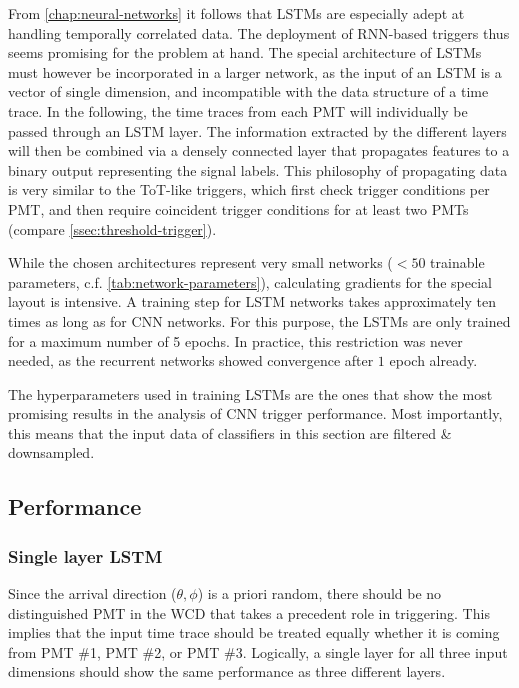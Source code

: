 From \autoref{chap:neural-networks} it follows that LSTMs are especially adept at handling temporally correlated data. The deployment of RNN-based triggers thus 
seems promising for the problem at hand. The special architecture of LSTMs must however be incorporated in a larger network, as the input of an LSTM is a 
vector of single dimension, and incompatible with the data structure of a time trace. In the following, the time traces from each PMT will individually be passed
through an LSTM layer. The information extracted by the different layers will then be combined via a densely connected layer that propagates features to a binary
output representing the signal labels. This philosophy of propagating data is very similar to the ToT-like triggers, which first check trigger conditions per PMT,
and then require coincident trigger conditions for at least two PMTs (compare \autoref{ssec:threshold-trigger}).

While the chosen architectures represent very small networks ($<50$ trainable parameters, c.f. \autoref{tab:network-parameters}), calculating gradients for the 
special layout is intensive. A training step for LSTM networks takes approximately ten times as long as for CNN networks. For this purpose, the LSTMs are only 
trained for a maximum number of 5 epochs. In practice, this restriction was never needed, as the recurrent networks showed convergence after $1$ epoch already.

The hyperparameters used in training LSTMs are the ones that show the most promising results in the analysis of CNN trigger performance. Most importantly, this 
means that the input data of classifiers in this section are filtered \& downsampled.

\subsection{Performance}
\label{ssec:cnn-charge-cut}

\subsubsection{Single layer LSTM}
\label{sssec:single-layer-lsmt}

Since the arrival direction ($\theta, \phi$) is a priori random, there should be no distinguished PMT in the WCD that takes a precedent role in triggering. This 
implies that the input time trace should be treated equally whether it is coming from PMT \#1, PMT \#2, or PMT \#3. Logically, a single layer for all three input
dimensions should show the same performance as three different layers. 

